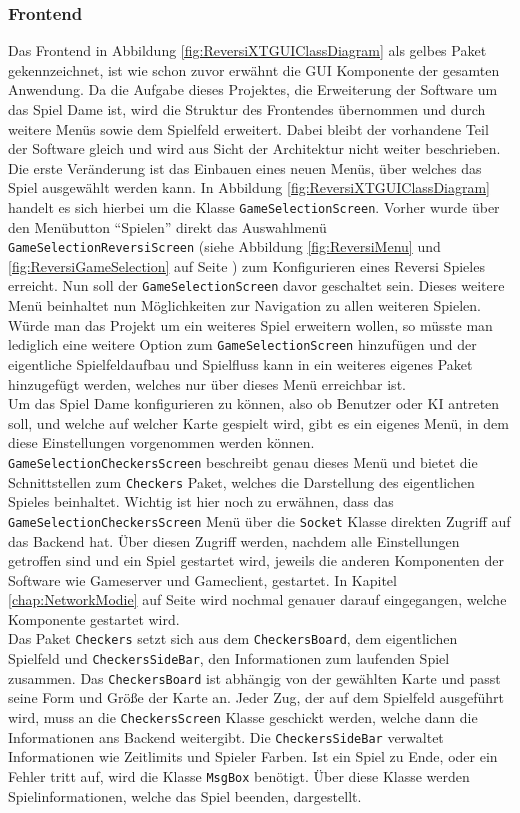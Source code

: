 \documentclass[12pt,a4paper,bibliography=totocnumbered,listof=totocnumbered]{article}
\begin{document}
\subsubsection{Frontend}
Das Frontend in Abbildung \ref{fig:ReversiXTGUIClassDiagram} als gelbes Paket gekennzeichnet, ist wie schon zuvor erwähnt die
GUI Komponente der gesamten Anwendung. Da die Aufgabe dieses Projektes, die Erweiterung der Software um das Spiel Dame ist, 
wird die Struktur des Frontendes übernommen und durch weitere Menüs sowie dem Spielfeld erweitert. Dabei bleibt der vorhandene Teil der Software gleich 
und wird aus Sicht der Architektur nicht weiter beschrieben. 
\\
Die erste Veränderung ist das Einbauen eines neuen Menüs, über welches das Spiel ausgewählt werden kann. In Abbildung \ref{fig:ReversiXTGUIClassDiagram} 
handelt es sich hierbei um die Klasse \texttt{GameSelectionScreen}. Vorher wurde über den Menübutton ``Spielen'' direkt das Auswahlmenü \texttt{GameSelectionReversiScreen}
(siehe Abbildung \ref{fig:ReversiMenu} und \ref{fig:ReversiGameSelection} auf Seite \pageref{fig:ReversiMenu}) zum Konfigurieren eines Reversi Spieles erreicht. 
Nun soll der \texttt{GameSelectionScreen} davor geschaltet sein. Dieses weitere Menü beinhaltet nun Möglichkeiten zur Navigation zu allen weiteren Spielen.
Würde man das Projekt um ein weiteres Spiel erweitern wollen, so müsste man lediglich eine weitere Option zum \texttt{GameSelectionScreen} hinzufügen 
und der eigentliche Spielfeldaufbau und Spielfluss kann in ein weiteres eigenes Paket hinzugefügt werden, welches nur über dieses Menü erreichbar ist.
\\
Um das Spiel Dame konfigurieren zu können, also ob Benutzer oder KI antreten soll, und welche auf welcher Karte gespielt wird, gibt es ein eigenes Menü, 
in dem diese Einstellungen vorgenommen werden können. \texttt{GameSelectionCheckersScreen} beschreibt genau dieses Menü und bietet die Schnittstellen 
zum \texttt{Checkers} Paket, welches die Darstellung des eigentlichen Spieles beinhaltet. Wichtig ist hier noch zu erwähnen, dass das \texttt{GameSelectionCheckersScreen}
Menü über die \texttt{Socket} Klasse direkten Zugriff auf das Backend hat. Über diesen Zugriff werden, nachdem alle Einstellungen getroffen sind und ein Spiel
gestartet wird, jeweils die anderen Komponenten der Software wie Gameserver und Gameclient, gestartet. In Kapitel \ref{chap:NetworkModie} auf Seite \pageref{chap:NetworkModie} 
wird nochmal genauer darauf eingegangen, welche Komponente gestartet wird.
\\
Das Paket \texttt{Checkers} setzt sich aus dem \texttt{CheckersBoard}, dem eigentlichen Spielfeld und \texttt{CheckersSideBar}, den Informationen zum laufenden Spiel zusammen. 
Das \texttt{CheckersBoard} ist abhängig von der gewählten Karte und passt seine Form und Größe der Karte an. Jeder Zug, der auf dem Spielfeld ausgeführt wird, muss an 
die \texttt{CheckersScreen} Klasse geschickt werden, welche dann die Informationen ans Backend weitergibt.
Die \texttt{CheckersSideBar} verwaltet Informationen wie Zeitlimits und Spieler Farben. 
Ist ein Spiel zu Ende, oder ein Fehler tritt auf, wird die Klasse \texttt{MsgBox} benötigt. Über diese Klasse werden Spielinformationen, welche das Spiel beenden, 
dargestellt.
\end{document}
